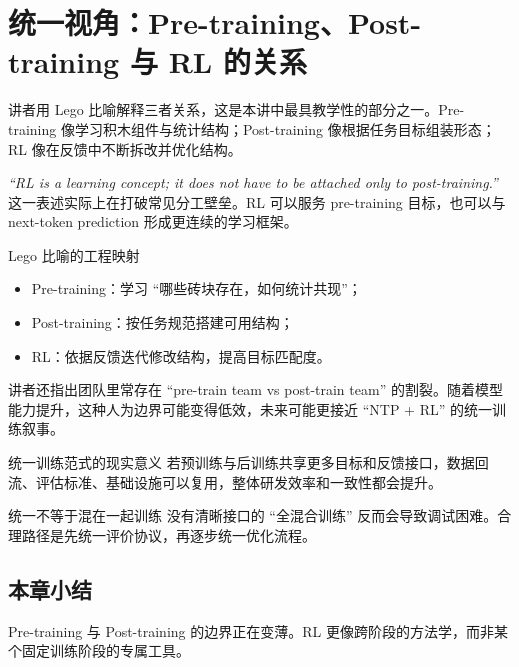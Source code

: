 \section{统一视角：Pre-training、Post-training 与 RL 的关系}

讲者用 Lego 比喻解释三者关系，这是本讲中最具教学性的部分之一。Pre-training 像学习积木组件与统计结构；Post-training 像根据任务目标组装形态；RL 像在反馈中不断拆改并优化结构。

\textit{``RL is a learning concept; it does not have to be attached only to post-training.''} 这一表述实际上在打破常见分工壁垒。RL 可以服务 pre-training 目标，也可以与 next-token prediction 形成更连续的学习框架。

\begin{knowledgebox}{Lego 比喻的工程映射}
\begin{itemize}
    \item Pre-training：学习 ``哪些砖块存在，如何统计共现''；
    \item Post-training：按任务规范搭建可用结构；
    \item RL：依据反馈迭代修改结构，提高目标匹配度。
\end{itemize}
\end{knowledgebox}

讲者还指出团队里常存在 ``pre-train team vs post-train team'' 的割裂。随着模型能力提升，这种人为边界可能变得低效，未来可能更接近 ``NTP + RL'' 的统一训练叙事。

\begin{importantbox}{统一训练范式的现实意义}
若预训练与后训练共享更多目标和反馈接口，数据回流、评估标准、基础设施可以复用，整体研发效率和一致性都会提升。
\end{importantbox}

\begin{warningbox}{统一不等于混在一起训练}
没有清晰接口的 ``全混合训练'' 反而会导致调试困难。合理路径是先统一评价协议，再逐步统一优化流程。
\end{warningbox}

\subsection{本章小结}
Pre-training 与 Post-training 的边界正在变薄。RL 更像跨阶段的方法学，而非某个固定训练阶段的专属工具。

